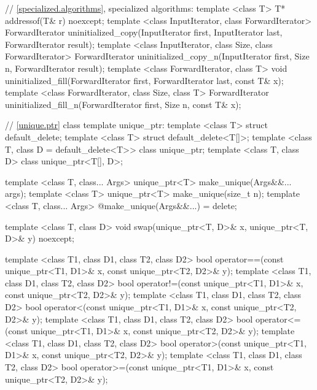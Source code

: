 \begin{codeblock}
{  // \ref{specialized.algorithms}, specialized algorithms:
  template <class T> T* addressof(T& r) noexcept;
  template <class InputIterator, class ForwardIterator>
    ForwardIterator uninitialized_copy(InputIterator first, InputIterator last,
                                       ForwardIterator result);
  template <class InputIterator, class Size, class ForwardIterator>
    ForwardIterator uninitialized_copy_n(InputIterator first, Size n,
                                         ForwardIterator result);
  template <class ForwardIterator, class T>
    void uninitialized_fill(ForwardIterator first, ForwardIterator last,
                            const T& x);
  template <class ForwardIterator, class Size, class T>
    ForwardIterator uninitialized_fill_n(ForwardIterator first, Size n, const T& x);

  // \ref{unique.ptr} class template unique_ptr:
  template <class T> struct default_delete;
  template <class T> struct default_delete<T[]>;
  template <class T, class D = default_delete<T>> class unique_ptr;
  template <class T, class D> class unique_ptr<T[], D>;

  template <class T, class... Args> unique_ptr<T> make_unique(Args&&... args);
  template <class T> unique_ptr<T> make_unique(size_t n);
  template <class T, class... Args> @\unspec@ make_unique(Args&&...) = delete;

  template <class T, class D> void swap(unique_ptr<T, D>& x, unique_ptr<T, D>& y) noexcept;

  template <class T1, class D1, class T2, class D2>
    bool operator==(const unique_ptr<T1, D1>& x, const unique_ptr<T2, D2>& y);
  template <class T1, class D1, class T2, class D2>
    bool operator!=(const unique_ptr<T1, D1>& x, const unique_ptr<T2, D2>& y);
  template <class T1, class D1, class T2, class D2>
    bool operator<(const unique_ptr<T1, D1>& x, const unique_ptr<T2, D2>& y);
  template <class T1, class D1, class T2, class D2>
    bool operator<=(const unique_ptr<T1, D1>& x, const unique_ptr<T2, D2>& y);
  template <class T1, class D1, class T2, class D2>
    bool operator>(const unique_ptr<T1, D1>& x, const unique_ptr<T2, D2>& y);
  template <class T1, class D1, class T2, class D2>
    bool operator>=(const unique_ptr<T1, D1>& x, const unique_ptr<T2, D2>& y);

}
\end{codeblock}
